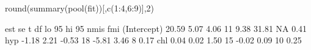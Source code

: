 \begin{Schunk}
\begin{Sinput}
 round(summary(pool(fit))[,c(1:4,6:9)],2)
\end{Sinput}
\begin{Soutput}
              est   se     t df lo 95 hi 95 nmis  fmi
(Intercept) 20.59 5.07  4.06 11  9.38 31.81   NA 0.41
hyp         -1.18 2.21 -0.53 18 -5.81  3.46    8 0.17
chl          0.04 0.02  1.50 15 -0.02  0.09   10 0.25
\end{Soutput}
\end{Schunk}
